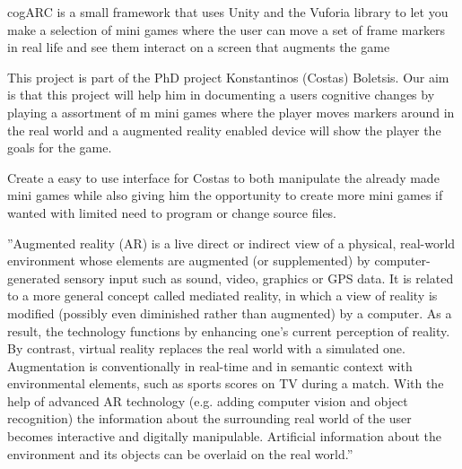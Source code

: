cogARC is a small framework that uses Unity and the Vuforia library to let you make a selection of mini games where the user can move a set of frame markers in real life and see them interact on a screen that augments the game

This project is part of the PhD project Konstantinos (Costas) Boletsis. Our aim is that this project will help him in documenting a users cognitive changes by playing a assortment of m mini games where the player moves markers around in the real world and a augmented reality enabled device will show the player the goals for the game.

Create a easy to use interface for Costas to both manipulate the already made mini games while also giving him the opportunity to create more mini games if wanted with limited need to program or change source files.

''Augmented reality (AR) is a live direct or indirect view of a physical, real-world environment whose elements are augmented (or supplemented) by computer-generated sensory input such as sound, video, graphics or GPS data. It is related to a more general concept called mediated reality, in which a view of reality is modified (possibly even diminished rather than augmented) by a computer. As a result, the technology functions by enhancing one’s current perception of reality. By contrast, virtual reality replaces the real world with a simulated one. Augmentation is conventionally in real-time and in semantic context with environmental elements, such as sports scores on TV during a match. With the help of advanced AR technology (e.g. adding computer vision and object recognition) the information about the surrounding real world of the user becomes interactive and digitally manipulable. Artificial information about the environment and its objects can be overlaid on the real world.''\cite{WikiAugmentedReality}

